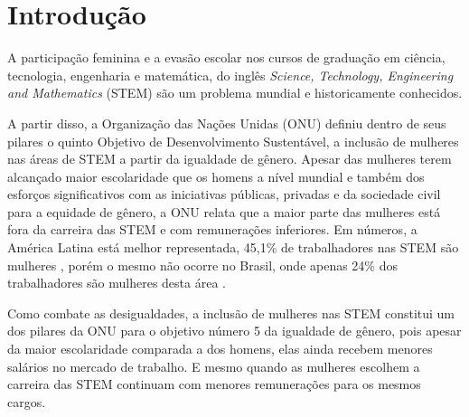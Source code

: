 \chapter{Introdução}\label{cap:Introducao}





A participação feminina e a evasão escolar nos cursos de graduação em  ciência, tecnologia, engenharia e matemática, do inglês \textit{Science, Technology, Engineering and Mathematics} (STEM) são um problema mundial e historicamente conhecidos. 


A partir disso, a Organização das Nações Unidas (ONU) definiu dentro de seus pilares o quinto Objetivo de Desenvolvimento Sustentável, a inclusão de mulheres nas áreas de STEM a partir da igualdade de gênero.
Apesar das mulheres terem alcançado maior escolaridade que os homens a nível mundial e também dos esforços significativos com as iniciativas públicas, privadas e da sociedade civil para a equidade de gênero, a ONU relata que a maior parte das mulheres está fora da carreira das STEM e com  remunerações inferiores. Em números, a América Latina está melhor representada, 45,1\% de trabalhadores nas STEM são mulheres \cite{unesco:2019}, porém o mesmo não ocorre no Brasil, onde apenas 24\% dos trabalhadores são mulheres desta área \cite{fernandes:2021}. 

Como combate as desigualdades, a inclusão de mulheres nas STEM constitui um dos pilares da ONU para o objetivo número 5 da igualdade de gênero, pois apesar da maior escolaridade comparada a dos homens, elas ainda recebem menores salários no mercado de trabalho. E mesmo quando as mulheres escolhem a carreira das STEM continuam com menores remunerações para os mesmos cargos.

